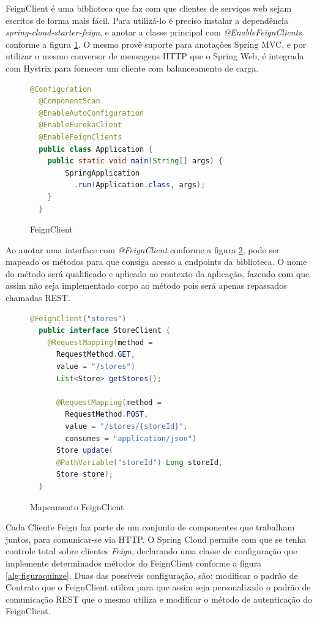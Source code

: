 \documentclass[journal]{IEEEtran}
\begin{document}
FeignClient é uma biblioteca que faz com que clientes de serviços web sejam escritos de forma mais fácil. Para utilizá-lo é preciso instalar a dependência \emph{spring-cloud-starter-feign}, e anotar a classe principal com \emph{@EnableFeignClients} conforme a figura \ref{alg:figuratreze}. O mesmo provê suporte para anotações Spring MVC, e por utilizar o mesmo conversor de mensagens HTTP que o Spring Web, é integrada com Hystrix para fornecer um cliente com balanceamento de carga.

\begin{figure}[h]
\centering

\begin{lstlisting}[language=Java]
  @Configuration
  @ComponentScan
  @EnableAutoConfiguration
  @EnableEurekaClient
  @EnableFeignClients
  public class Application {
    public static void main(String[] args) {
        SpringApplication
          .run(Application.class, args);
    }
  }
\end{lstlisting}

\caption{FeignClient}
\label{alg:figuratreze}
\end{figure}

Ao anotar uma interface com \emph{@FeignClient} conforme a figura \ref{alg:figuraquartorze}, pode ser mapeado os métodos para que consiga acesso a endpoints da biblioteca. O nome do método será qualificado e aplicado ao contexto da aplicação, fazendo com que assim não seja implementado corpo ao método pois será apenas repassados chamadas REST.

\begin{figure}[h]
\centering

\begin{lstlisting}[language=Java]
  @FeignClient("stores")
  public interface StoreClient {
    @RequestMapping(method = 
      RequestMethod.GET, 
      value = "/stores")
      List<Store> getStores();

      @RequestMapping(method = 
        RequestMethod.POST, 
        value = "/stores/{storeId}", 
        consumes = "application/json")
      Store update(
      @PathVariable("storeId") Long storeId, 
      Store store);
  }
\end{lstlisting}

\caption{Mapeamento FeignClient}
\label{alg:figuraquartorze}
\end{figure}

Cada Cliente Feign faz parte de um conjunto de componentes que trabalham juntos, para comunicar-se via HTTP. O Spring Cloud permite com que se tenha controle total sobre clientes \emph{Feign}, declarando uma classe de configuração que implemente determinados métodos do FeignClient conforme a figura \ref{alg:figuraquinze}. Duas das possíveis configuração, são: modificar o padrão de Contrato que o FeignClient utiliza para que assim seja personalizado o padrão de comunicação REST que o mesmo utiliza e modificar o método de autenticação do FeignClient.
\end{document}
